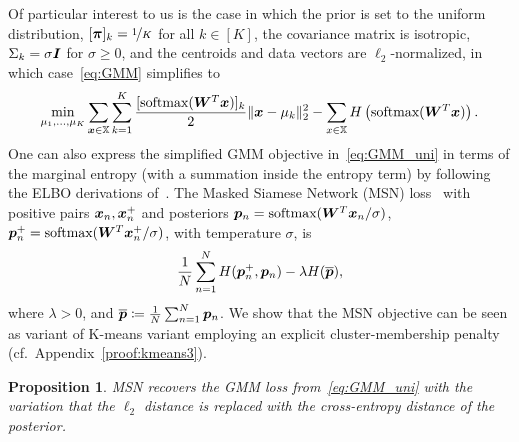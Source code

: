 \documentclass{article} %
\newcommand{\defeq}{\coloneqq}
\newtheorem{proposition}{Proposition}
\begin{document}
Of particular interest to us is the case in which the prior is set to the uniform distribution, $[{\bm{\pi}}]_k = \nicefrac{1}{K}$ for all $k \in [K]$, the covariance matrix is isotropic, $\Sigma_k=\sigma {\bm{I}}$ for $\sigma \geq 0$, and the centroids and data vectors are $\ell_2$-normalized, in which case~\eqref{eq:GMM} simplifies to 
\begin{equation}
    \min_{\mu_1,\ldots,\mu_K}\sum_{{\bm{x}} \in {\mathbb{X}}}\sum_{k=1}^{K}
     \frac{[\text{softmax}({\bm{W}}^T{\bm{x}})]_k}{2}\|{\bm{x}}-\mu_k\|^2_{2}-\sum_{x\in {\mathbb{X}}} H\left(\text{softmax}({\bm{W}}^T{\bm{x}})\right).
     \label{eq:GMM_uni}
\end{equation}
One can also express the simplified GMM objective in~\eqref{eq:GMM_uni} in terms of the marginal entropy (with a summation inside the entropy term) by following the ELBO derivations of~\citet{hoffman2016elbo}.
The Masked Siamese Network (MSN) loss~\citep{assran2022masked} with positive pairs ${\bm{x}}_n,{\bm{x}}_n^+$ and posteriors ${\bm{p}}_n=\text{softmax}({\bm{W}}^T{\bm{x}}_n/\sigma)$, ${\bm{p}}_n^+=\text{softmax}({\bm{W}}^T{\bm{x}}_n^+/\sigma)$, with temperature $\sigma$, is
\begin{equation}
    \label{eq:msn}
    \frac{1}{N} \sum^N_{n=1} H({\bm{p}}_{n}^+, {\bm{p}}_n) - \lambda H({\overline{{\bm{p}}}}),
\end{equation}
where $\lambda > 0$, and $\overline{\vp} \defeq \frac{1}{N} \sum^N_{n=1} \vp_n$.
We show that the MSN objective can be seen as variant of K-means variant employing an explicit cluster-membership penalty (cf.~Appendix~\ref{proof:kmeans3}).
\begin{proposition}
\label{prop:msn}
    MSN recovers the GMM loss from~\eqref{eq:GMM_uni} with the variation that the $\ell_2$ distance is replaced with the cross-entropy distance of the posterior.
\end{proposition}
\end{document}
